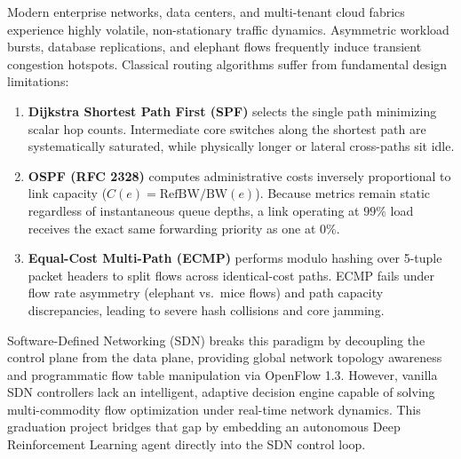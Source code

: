 \documentclass[10pt,twocolumn,a4paper]{article}
\begin{document}
Modern enterprise networks, data centers, and multi-tenant cloud fabrics experience highly volatile, non-stationary traffic dynamics. Asymmetric workload bursts, database replications, and elephant flows frequently induce transient congestion hotspots. Classical routing algorithms suffer from fundamental design limitations:
\begin{enumerate}[leftmargin=*,itemsep=1pt,topsep=2pt]
    \item \textbf{Dijkstra Shortest Path First (SPF)} selects the single path minimizing scalar hop counts. Intermediate core switches along the shortest path are systematically saturated, while physically longer or lateral cross-paths sit idle.
    \item \textbf{OSPF (RFC 2328)} computes administrative costs inversely proportional to link capacity ($C(e) = \text{RefBW} / \text{BW}(e)$). Because metrics remain static regardless of instantaneous queue depths, a link operating at $99\%$ load receives the exact same forwarding priority as one at $0\%$.
    \item \textbf{Equal-Cost Multi-Path (ECMP)} performs modulo hashing over 5-tuple packet headers to split flows across identical-cost paths. ECMP fails under flow rate asymmetry (elephant vs.\ mice flows) and path capacity discrepancies, leading to severe hash collisions and core jamming.
\end{enumerate}

Software-Defined Networking (SDN) breaks this paradigm by decoupling the control plane from the data plane, providing global network topology awareness and programmatic flow table manipulation via OpenFlow 1.3. However, vanilla SDN controllers lack an intelligent, adaptive decision engine capable of solving multi-commodity flow optimization under real-time network dynamics. This graduation project bridges that gap by embedding an autonomous Deep Reinforcement Learning agent directly into the SDN control loop.
\end{document}
